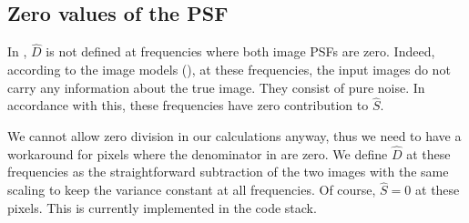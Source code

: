 \documentclass[11pt]{article}
\begin{document}
\subsection{Zero values of the PSF\label{sec:PSFzero}}
%
\par In , \(\hat{D}\) is not defined at frequencies where both
image PSFs are zero. Indeed, according to the image models (), at
these frequencies, the input images do not carry any information about the
true image. They consist of pure noise. In accordance with this, these
frequencies have zero contribution to \(\hat{S}\).
%
\par We cannot allow zero division in our calculations anyway, thus we
need to have a workaround for pixels where the denominator in
 are zero. We define \(\hat{D}\) at these
frequencies as the straightforward subtraction of the two images with
the same scaling to keep the variance constant at all
frequencies. Of course, \(\hat{S}=0\) at these pixels. This is
currently implemented in the code stack.
%
\end{document}
